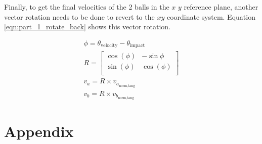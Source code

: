 \documentclass[12pt]{article}
\begin{document}
Finally, to get the final velocities of the 2 balls in the $x$ $y$ reference plane, another vector rotation
needs to be done to revert to the $xy$ coordinate system. Equation \ref{eqn:part_1_rotate_back} shows this vector rotation.

\begin{equation}
    \label{eqn:part_1_rotate_back}
    \begin{gathered}
        \phi = \theta_\text{velocity} - \theta_\text{impact}\\
        R = 
        \left[
        \begin{matrix}
            \cos(\phi) & -\sin{\phi}\\
            \sin(\phi) & \cos(\phi)\\
        \end{matrix}
        \right]\\
        v_a = R \times v_{a_\text{norm,tang}} \\
        v_b = R \times v_{b_\text{norm,tang}}
    \end{gathered}
\end{equation}

\pagebreak
\section{Appendix}

\end{document}
